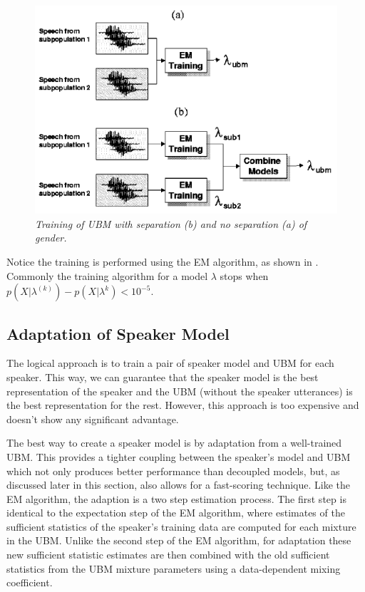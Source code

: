 \documentclass[a4paper,twocolumn]{article}
\begin{document}
\begin{figure}[h]
    \label{fig:gmm_ubm_training}
    \centering
    \includegraphics[scale=0.4]{gmm-ubm-training}
    \caption{\textit{Training of UBM with separation (b) and no separation (a) of gender.}}
\end{figure}

\noindent Notice the training is performed using the EM algorithm, as shown in \cite{dempster_1977}. Commonly the training algorithm for a model $\lambda$ stops when $p(X|\lambda^{(k)}) - p(X|\lambda^k) < 10^{-5}$.

\subsection{Adaptation of Speaker Model}

The logical approach is to train a pair of speaker model and UBM for each speaker. This way, we can guarantee that the speaker model is the best representation of the speaker and the UBM (without the speaker utterances) is the best representation for the rest. However, this approach is too expensive and doesn't show any significant advantage.

The best way to create a speaker model is by adaptation from a well-trained UBM. This provides a tighter coupling between the speaker’s model and UBM which not only produces better performance than decoupled models, but, as discussed later in this section, also allows for a fast-scoring technique. Like the EM algorithm, the adaption is a two step estimation process. The first step is identical to the expectation step of the EM algorithm, where estimates of the sufficient statistics of the speaker’s training data are computed for each mixture in the UBM. Unlike the second step of the EM algorithm, for adaptation these new sufficient statistic estimates are then combined with the old sufficient statistics from the UBM mixture parameters using a data-dependent mixing coefficient.
\end{document}
